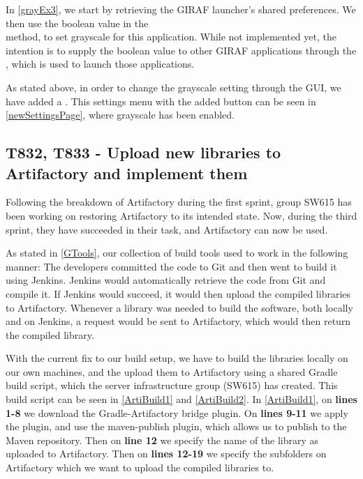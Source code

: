 In \autoref{grayEx3}, we start by retrieving the GIRAF launcher's shared
preferences. We then use the boolean
 value in the \\
 method, to set grayscale for this
application. While not implemented yet, the intention is to supply the boolean
value to other GIRAF applications through the , which is
used to launch those applications.\nl

As stated above, in order to change the grayscale setting through the GUI, we
have added a . This settings menu with the added button can
be seen in \autoref{newSettingsPage}, where grayscale has been enabled. 



\subsection{T832, T833 - Upload new libraries to Artifactory and implement them}

Following the breakdown of Artifactory during the first sprint, group SW615 has
been working on restoring Artifactory to its intended state. Now, during the
third sprint, they have succeeded in their task, and Artifactory can now be
used.\nl

As stated in \autoref{GTools}, our collection of build tools used to work in the
following manner:
The developers committed the code to Git and then went to build it using
Jenkins. Jenkins would automatically retrieve the code from Git and compile it.
If Jenkins would succeed, it would then upload the compiled libraries to
Artifactory. Whenever a library was needed to build the software, both locally
and on Jenkins, a request would be sent to Artifactory, which would then return
the compiled library.\nl

With the current fix to our build setup, we have to build the libraries locally
on our own machines, and the upload them to Artifactory using a shared Gradle
build script, which the server infrastructure group (SW615) has created. This
build script can be seen in \autoref{ArtiBuild1} and \autoref{ArtiBuild2}. In
\autoref{ArtiBuild1}, on \textbf{lines 1-8} we download the Gradle-Artifactory
bridge plugin\citep{Gradle-Artifactory}. On \textbf{lines 9-11} we apply the
plugin, and use the maven-publish plugin, which allows us to publish to the
Maven repository. Then on \textbf{line 12} we specify the name of the library as
uploaded to Artifactory. Then on \textbf{lines 12-19} we specify the subfolders
on Artifactory which we want to upload the compiled libraries to.\nl

